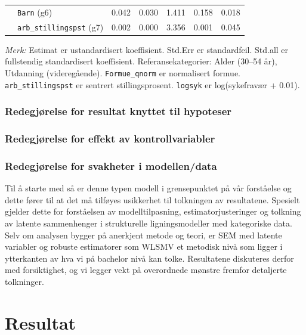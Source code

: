 \documentclass[
  12pt,
  a4paper,
  DIV=11,
  numbers=noendperiod]{scrartcl}
\begin{document}
\begin{table}[htbp]
\begin{tabular}{@{}llrrrrc@{}}
& \texttt{Barn} (g6) & 0.042 & 0.030 & 1.411 & 0.158 & 0.018 \\
& \texttt{arb\_stillingspst} (g7) & 0.002 & 0.000 & 3.356 & 0.001 & 0.045 \\
\bottomrule
\end{tabular}
\footnotesize{\textit{Merk:} Estimat er ustandardisert koeffisient. Std.Err er standardfeil. Std.all er fullstendig standardisert koeffisient. Referansekategorier: Alder (30–54 år), Utdanning (videregående). \texttt{Formue\_qnorm} er normalisert formue. \texttt{arb\_stillingspst} er sentrert stillingsprosent. \texttt{logsyk} er log(sykefravær + 0.01).}
\end{table}

\subsubsection{Redegjørelse for resultat knyttet til
hypoteser}\label{redegjuxf8relse-for-resultat-knyttet-til-hypoteser}

\subsubsection{Redegjørelse for effekt av
kontrollvariabler}\label{redegjuxf8relse-for-effekt-av-kontrollvariabler}

\subsubsection{Redegjørelse for svakheter i
modellen/data}\label{redegjuxf8relse-for-svakheter-i-modellendata}

Til å starte med så er denne typen modell i grensepunktet på vår
forståelse og dette fører til at det må tilføyes usikkerhet til
tolkningen av resultatene. Spesielt gjelder dette for forståelsen av
modelltilpasning, estimatorjusteringer og tolkning av latente
sammenhenger i strukturelle ligningsmodeller med kategoriske data. Selv
om analysen bygger på anerkjent metode og teori, er SEM med latente
variabler og robuste estimatorer som WLSMV et metodisk nivå som ligger i
ytterkanten av hva vi på bachelor nivå kan tolke. Resultatene diskuteres
derfor med forsiktighet, og vi legger vekt på overordnede mønstre
fremfor detaljerte tolkninger.

\newpage

\section{Resultat}\label{resultat}
\end{document}
